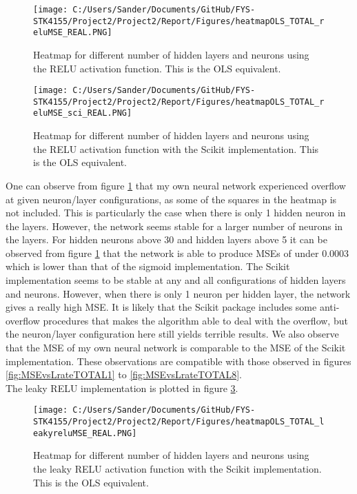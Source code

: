 \documentclass[12pt,a4paper]{article}
\begin{document}
\begin{figure}[H]
\centering
\texttt{[image: C:/Users/Sander/Documents/GitHub/FYS-STK4155/Project2/Project2/Report/Figures/heatmapOLS\_TOTAL\_reluMSE\_REAL.PNG]}
\caption{\label{fig:heatmap2} Heatmap for different number of hidden layers and neurons using the RELU activation function. This is the OLS equivalent.}
\end{figure}

\begin{figure}[H]
\centering
\texttt{[image: C:/Users/Sander/Documents/GitHub/FYS-STK4155/Project2/Project2/Report/Figures/heatmapOLS\_TOTAL\_reluMSE\_sci\_REAL.PNG]}
\caption{\label{fig:heatmap3} Heatmap for different number of hidden layers and neurons using the RELU activation function with the Scikit implementation. This is the OLS equivalent.}
\end{figure}

\noindent One can observe from figure \ref{fig:heatmap2} that my own neural network experienced overflow at given neuron/layer configurations, as some of the squares in the heatmap is not included. This is particularly the case when there is only 1 hidden neuron in the layers. However, the network seems stable for a larger number of neurons in the layers. For hidden neurons above 30 and hidden layers above 5 it can be observed from figure \ref{fig:heatmap2} that the network is able to produce MSEs of under $0.0003$ which is lower than that of the sigmoid implementation. The Scikit implementation seems to be stable at any and all configurations of hidden layers and neurons. However, when there is only 1 neuron per hidden layer, the network gives a really high MSE. It is likely that the Scikit package includes some anti-overflow procedures that makes the algorithm able to deal with the overflow, but the neuron/layer configuration here still yields terrible results. We also observe that the MSE of my own neural network is comparable to the MSE of the Scikit implementation. These observations are compatible with those observed in figures \ref{fig:MSEvsLrateTOTAL1} to \ref{fig:MSEvsLrateTOTAL8}. 
\\
The leaky RELU implementation is plotted in figure \ref{fig:heatmap4}.

\begin{figure}[H]
\centering
\texttt{[image: C:/Users/Sander/Documents/GitHub/FYS-STK4155/Project2/Project2/Report/Figures/heatmapOLS\_TOTAL\_leakyreluMSE\_REAL.PNG]}
\caption{\label{fig:heatmap4} Heatmap for different number of hidden layers and neurons using the leaky RELU activation function with the Scikit implementation. This is the OLS equivalent.}
\end{figure}
\end{document}
